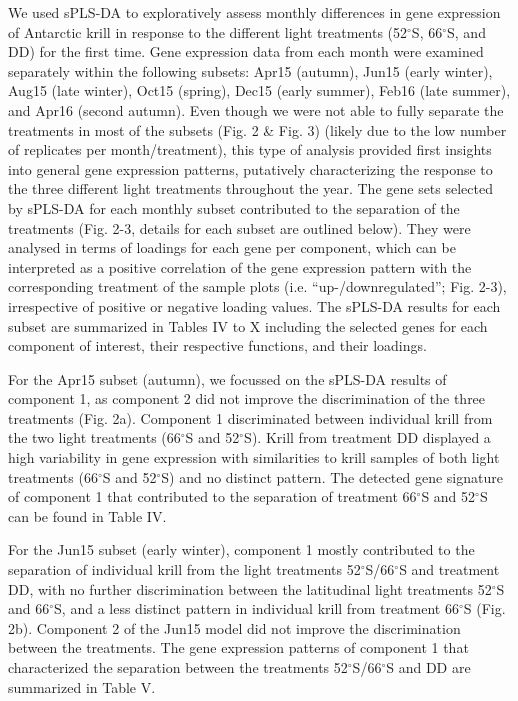 We used sPLS-DA to exploratively assess monthly differences in gene expression
of Antarctic krill in response to the different light treatments (52$^{\circ}$S, 66$^{\circ}$S,
and DD) for the first time. Gene expression data from each month were examined
separately within the following subsets: Apr15 (autumn), Jun15 (early winter),
Aug15 (late winter), Oct15 (spring), Dec15 (early summer), Feb16 (late summer),
and Apr16 (second autumn). Even though we were not able to fully separate the
treatments in most of the subsets (Fig. 2 \& Fig. 3) (likely due to the low
number of replicates per month/treatment), this type of analysis provided first
insights into general gene expression patterns, putatively characterizing the
response to the three different light treatments throughout the year. The gene
sets selected by sPLS-DA for each monthly subset contributed to the separation
of the treatments (Fig. 2-3, details for each subset are outlined below). They
were analysed in terms of loadings for each gene per component, which can be
interpreted as a positive correlation of the gene expression pattern with the
corresponding treatment of the sample plots (i.e. “up-/downregulated”; Fig.
2-3), irrespective of positive or negative loading values. The sPLS-DA results
for each subset are summarized in Tables IV to X including the selected genes
for each component of interest, their respective functions, and their loadings.


For the Apr15 subset (autumn), we focussed on the sPLS-DA results of component
1, as component 2 did not improve the discrimination of the three treatments
(Fig. 2a). Component 1 discriminated between individual krill from the two
light treatments (66$^{\circ}$S and 52$^{\circ}$S). Krill from treatment DD
displayed a high variability in gene expression with similarities to krill
samples of both light treatments (66$^{\circ}$S and 52$^{\circ}$S) and no
distinct pattern. The detected gene signature of component 1 that contributed
to the separation of treatment 66$^{\circ}$S and 52$^{\circ}$S can be found in
Table IV.

For the Jun15 subset (early winter), component 1 mostly contributed to the
separation of individual krill from the light treatments
52$^{\circ}$S/66$^{\circ}$S and treatment DD, with no further discrimination
between the latitudinal light treatments 52$^{\circ}$S and 66$^{\circ}$S, and a
less distinct pattern in individual krill from treatment 66$^{\circ}$S (Fig.
2b). Component 2 of the Jun15 model did not improve the discrimination between
the treatments. The gene expression patterns of component 1 that characterized
the separation between the treatments 52$^{\circ}$S/66$^{\circ}$S and DD are
summarized in Table V.

